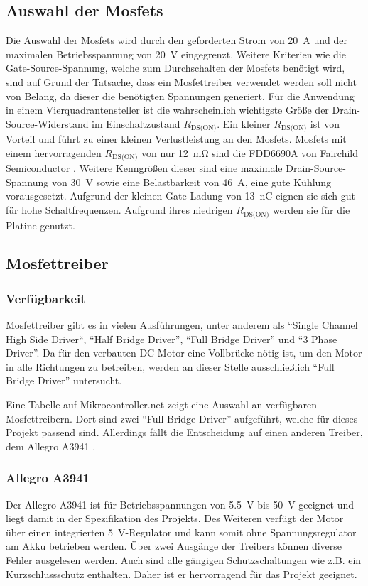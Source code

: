 \subsection{Auswahl der Mosfets}
Die Auswahl der Mosfets wird durch den geforderten Strom von \SI{20}{\ampere} und der maximalen Betriebsspannung von \SI{20}{\volt} eingegrenzt. Weitere Kriterien wie die Gate-Source-Spannung, welche zum Durchschalten
der Mosfets benötigt wird, sind auf Grund der Tatsache, dass ein Mosfettreiber verwendet werden soll nicht von Belang, da dieser die benötigten Spannungen generiert.
Für die Anwendung in einem Vierquadrantensteller ist die wahrscheinlich wichtigste Größe der Drain-Source-Widerstand im Einschaltzustand $R_{\text{DS(ON)}}$.
Ein kleiner $R_{\text{DS(ON)}}$ ist von Vorteil und führt zu einer kleinen Verlustleistung an den Mosfets.
Mosfets mit einem hervorragenden $R_{\text{DS(ON)}}$ von nur \SI{12}{\milli\ohm} sind die FDD6690A von Fairchild Semiconductor \cite{ds-fs}. Weitere Kenngrößen dieser sind
eine maximale Drain-Source-Spannung von \SI{30}{\volt} sowie eine Belastbarkeit von \SI{46}{\ampere}, eine gute Kühlung vorausgesetzt. Aufgrund der kleinen Gate Ladung von \SI{13}{\nano\coulomb} eignen
sie sich gut für hohe Schaltfrequenzen. Aufgrund ihres niedrigen $R_{\text{DS(ON)}}$ werden sie für die Platine genutzt.


\subsection{Mosfettreiber}

\subsubsection{Verfügbarkeit}

Mosfettreiber gibt es in vielen Ausführungen, unter anderem als ``Single Channel High Side Driver``, ``Half Bridge Driver'', ``Full Bridge Driver''
und ``3 Phase Driver''. Da für den verbauten DC-Motor eine Vollbrücke nötig ist, um den Motor in alle Richtungen zu betreiben, werden an dieser Stelle
ausschließlich ``Full Bridge Driver'' untersucht.

Eine Tabelle auf Mikrocontroller.net\cite{FET_D_TABLE} zeigt eine Auswahl an ver\-füg\-ba\-ren Mosfettreibern. Dort sind zwei
``Full Bridge Driver'' aufgeführt, welche für dieses Projekt passend sind. Allerdings fällt die Entscheidung auf einen anderen Treiber,
dem Allegro A3941 \cite{ds-A3941}.
\subsubsection{Allegro A3941}
Der Allegro A3941  ist für Betriebsspannungen von \SI{5,5}{\volt} bis \SI{50}{\volt} geeignet und liegt damit in der Spezifikation des Projekts.
Des Weiteren verfügt der Motor über einen integrierten \SI{5}{\volt}-Regulator und kann somit ohne Spannungsregulator am Akku betrieben werden.
Über zwei Ausgänge der Treibers können diverse Fehler ausgelesen werden. Auch sind alle gängigen Schutzschaltungen wie z.B. ein Kurzschlussschutz enthalten.
Daher ist er hervorragend für das Projekt geeignet.


